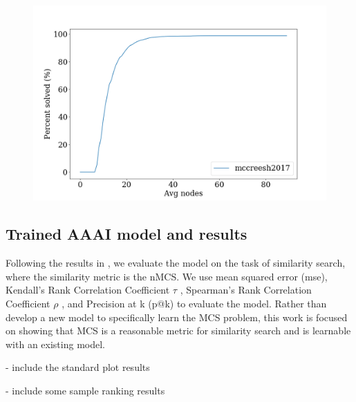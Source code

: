 \begin{figure}
    \centering
    \includegraphics[width=\textwidth]{figures/pct_solved_avg_nodes.png}
    \caption{}
    \label{fig:solution_limits}
\end{figure}



\subsection{Trained AAAI model and results}


Following the results in \cite{bai2018convolutional}, we evaluate the model on the task of similarity search, where the similarity metric is the nMCS. We use mean squared error (mse), Kendall's Rank Correlation Coefficient $\tau$ \cite{kendall1938new}, Spearman's Rank Correlation Coefficient $\rho$ \cite{spearman1904proof}, and Precision at k (p@k) to evaluate the model. Rather than develop a new model to specifically learn the MCS problem, this work is focused on showing that MCS is a reasonable metric for similarity search and is learnable with an existing model.


- include the standard plot results

- include some sample ranking results

